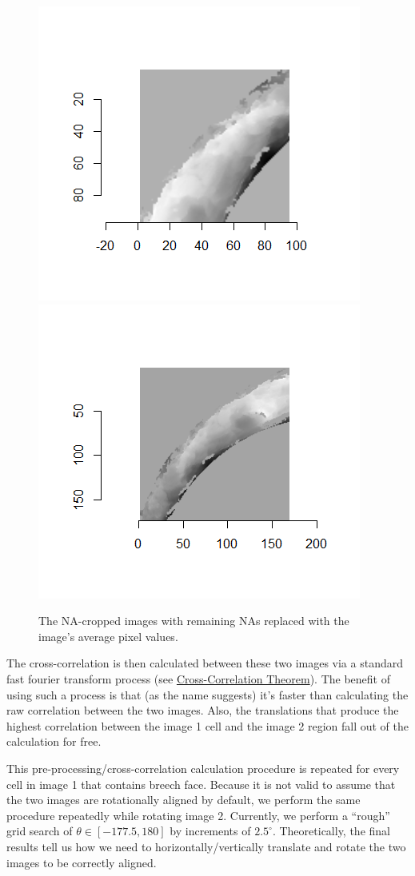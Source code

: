 \documentclass[]{book}
\begin{document}
\begin{figure}

{\centering \includegraphics[width=0.5\linewidth]{images/joeZ/im1_splitShifted} \includegraphics[width=0.5\linewidth]{images/joeZ/im2_splitShifted} 

}

\caption{The NA-cropped images with remaining NAs replaced with the image's average pixel values.}\label{fig:unnamed-chunk-11}
\end{figure}

The cross-correlation is then calculated between these two images via a standard fast fourier transform process (see \href{http://mathworld.wolfram.com/Cross-CorrelationTheorem.html}{Cross-Correlation Theorem}). The benefit of using such a process is that (as the name suggests) it's faster than calculating the raw correlation between the two images. Also, the translations that produce the highest correlation between the image 1 cell and the image 2 region fall out of the calculation for free.

This pre-processing/cross-correlation calculation procedure is repeated for every cell in image 1 that contains breech face. Because it is not valid to assume that the two images are rotationally aligned by default, we perform the same procedure repeatedly while rotating image 2. Currently, we perform a ``rough'' grid search of \(\theta \in [-177.5,180]\) by increments of \(2.5^{\circ}\). Theoretically, the final results tell us how we need to horizontally/vertically translate and rotate the two images to be correctly aligned.
\end{document}
